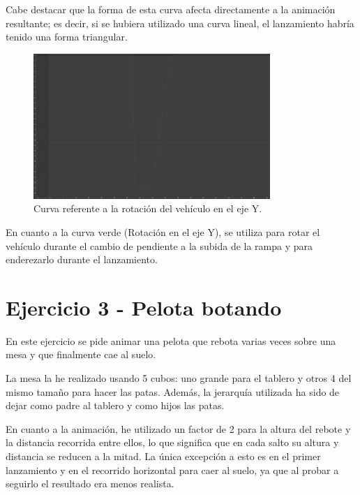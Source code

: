 \documentclass{article}
\begin{document}
\bigskip

Cabe destacar que la forma de esta curva afecta directamente a la animación resultante; es decir, si se hubiera utilizado una curva lineal, el lanzamiento habría tenido una forma triangular.

\begin{figure}[H]
    \centering
    \includegraphics[width=0.8\textwidth]{imagenes/Ejercicio2/corregidas/curvas/green.png}
    \caption{Curva referente a la rotación del vehículo en el eje Y.}
\end{figure}

En cuanto a la curva verde (Rotación en el eje Y), se utiliza para rotar el vehículo durante el cambio de pendiente a la subida de la rampa y para enderezarlo durante el lanzamiento.


\section{Ejercicio 3 - Pelota botando}

En este ejercicio se pide animar una pelota que rebota varias veces sobre una mesa y que finalmente cae al suelo.

\bigskip

La mesa la he realizado usando 5 cubos: uno grande para el tablero y otros 4 del mismo tamaño para hacer las patas. Además, la jerarquía utilizada ha sido de dejar como padre al tablero y como hijos las patas.

\bigskip

En cuanto a la animación, he utilizado un factor de 2 para la altura del rebote y la distancia recorrida entre ellos, lo que significa que en cada salto su altura y distancia se reducen a la mitad. La única excepción a esto es en el primer lanzamiento y en el recorrido horizontal para caer al suelo, ya que al probar a seguirlo el resultado era menos realista. 
\end{document}
